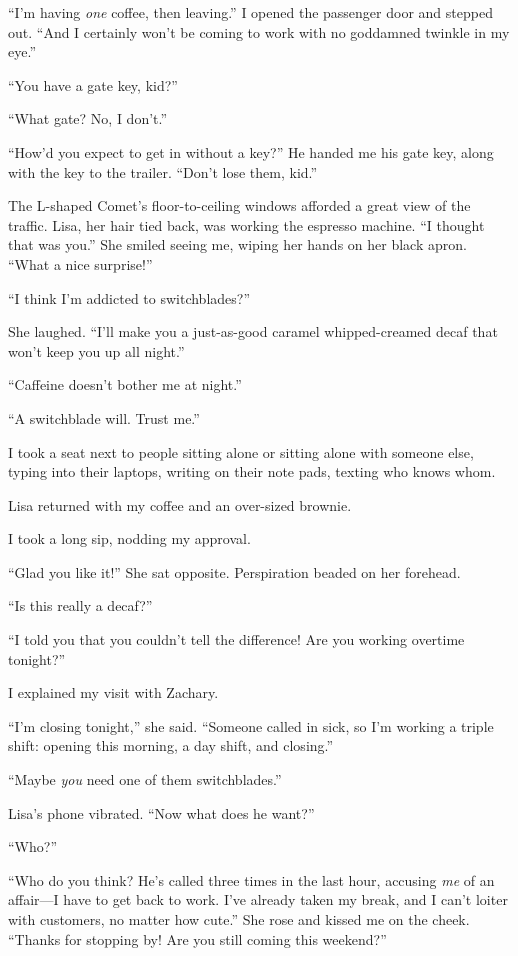 ``I'm having \emph{one} coffee, then leaving.'' I opened the passenger
door and stepped out. ``And I certainly won't be coming to work with no
goddamned twinkle in my eye.''

``You have a gate key, kid?''

``What gate? No, I don't.''

``How'd you expect to get in without a key?'' He handed me his gate key,
along with the key to the trailer. ``Don't lose them, kid.''

The L-shaped Comet's floor-to-ceiling windows afforded a great view of
the traffic. Lisa, her hair tied back, was working the espresso machine.
``I thought that was you.'' She smiled seeing me, wiping her hands on
her black apron. ``What a nice surprise!''

``I think I'm addicted to switchblades?''

She laughed. ``I'll make you a just-as-good caramel whipped-creamed
decaf that won't keep you up all night.''

``Caffeine doesn't bother me at night.''

``A switchblade will. Trust me.''

I took a seat next to people sitting alone or sitting alone with someone
else, typing into their laptops, writing on their note pads, texting who
knows whom.

Lisa returned with my coffee and an over-sized brownie.

I took a long sip, nodding my approval.

``Glad you like it!'' She sat opposite. Perspiration beaded on her
forehead.

``Is this really a decaf?''

``I told you that you couldn't tell the difference! Are you working
overtime tonight?''

I explained my visit with Zachary.

``I'm closing tonight,'' she said. ``Someone called in sick, so I'm
working a triple shift: opening this morning, a day shift, and
closing.''

``Maybe \emph{you} need one of them switchblades.''

Lisa's phone vibrated. ``Now what does he want?''

``Who?''

``Who do you think? He's called three times in the last hour, accusing
\emph{me} of an affair---I have to get back to work. I've already taken
my break, and I can't loiter with customers, no matter how cute.'' She
rose and kissed me on the cheek. ``Thanks for stopping by! Are you still
coming this weekend?''

